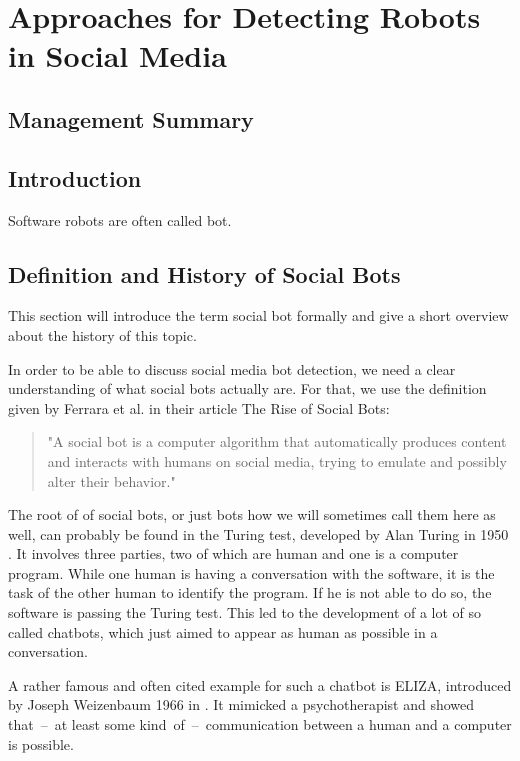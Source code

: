 \newpage
\chapter{Approaches for Detecting Robots \\ in Social Media}
\section*{Management Summary}


\section{Introduction}
Software robots are often called bot.

\section{Definition and History of Social Bots} 
This section will introduce the term social bot formally and give a short overview about the history of this topic.

In order to be able to discuss social media bot detection, we need a clear understanding of what social bots actually are.  For that, we use the definition given by Ferrara et al. in their article The Rise of Social Bots:
\begin{quote}
	"A social bot is a computer algorithm that automatically produces content and interacts with humans on social media, trying to emulate and possibly alter their behavior." \cite{ferrara15}
\end{quote}

The root of of social bots, or just bots how we will sometimes call them here as well, can probably be found in the Turing test, developed by Alan Turing in 1950 \cite{turing}. It involves three parties, two of which are human and one is a computer program. While one human is having a conversation with the software, it is the task of the other human to identify the program. If he is not able to do so, the software is passing the Turing test. This led to the development of a lot of so called chatbots, which just aimed to appear as human as possible in a conversation.  

A rather famous and often cited example for such a chatbot is ELIZA, introduced by Joseph Weizenbaum 1966 in \cite{eliza}. It mimicked a psychotherapist and showed \mbox{that -- at} least some kind\mbox{ of -- communication} between a human and a computer is possible.

